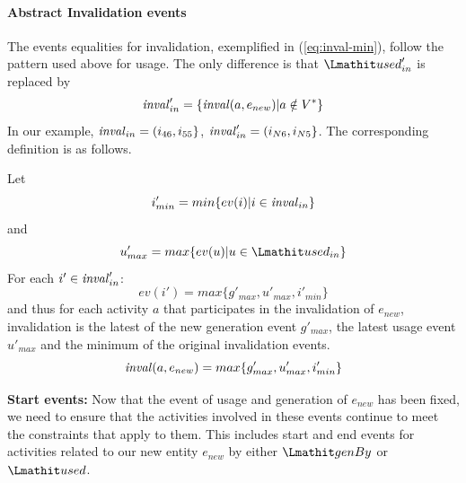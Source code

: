 \paragraph*{\textbf{Abstract Invalidation events}}
The events equalities for invalidation, exemplified in (\ref{eq:inval-min}), follow the pattern used above for usage. The only difference is that $\used'_{in}$ is replaced by 
\[ \mathit{inval}'_{in} = \{ \mathit{inval}(a, e_{new}) | a \notin V^* \} \]
In our example, $ \mathit{inval}_{in} = (  i_{46}, i_{55} \}$,  $\mathit{inval}'_{in} = ( i_{N6}, i_{N5} \}$.
%
The corresponding definition is as follows.

\vspace*{10pt}
\begin{definition} 
\label{def:abstract-inv}
Let
\[i'_{min} = min \{ ev(i) | i \in \mathit{inval}_{in} \}\]
and 
\[u'_{max} = max \{ ev(u) | u \in \used_{in} \}\]
For each $i' \in \mathit{inval}'_{in}$:
\[
ev(i') = max \{ g'_{max} , u'_{max},  i'_{min}\}
\]
and thus for each activity $a$  that participates in the invalidation of $e_{new}$, invalidation is the latest of the new generation event $g'_{max}$, the latest usage event $u'_{max}$ and the minimum of the original invalidation events.  
\begin{equation}
\mathit{inval}(a,e_{new}) = max \{ g'_{max} , u'_{max},  i'_{min} \}
\end{equation}
\end{definition}


{\bf Start events:} Now that the event of usage and generation of $e_{new}$ has been fixed, we need to ensure that the activities involved in these events continue to meet the constraints that apply to them. This includes start and end events for activities related to our new entity $e_{new}$ by either $\wgby$ or $\used$.  


